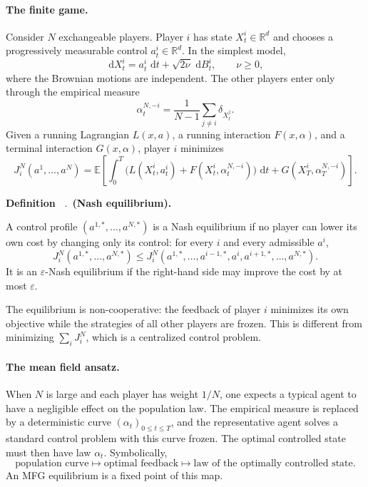\documentclass[11pt,a4paper]{article}
\theoremstyle{definition}
\newenvironment{definition}[1][]{%
  \begin{definitionbox}\refstepcounter{theorem}%
  \noindent\textbf{Definition~\thetheorem}%
  \if\relax\detokenize{#1}\relax.\else\ \textbf{(#1).}\fi\enspace
}{\end{definitionbox}}
\newcommand{\RR}{\mathbb R}
\newcommand{\dd}{\,\mathrm d}
\newcommand{\eps}{\varepsilon}
\newcommand{\al}{\alpha}
\begin{document}
\paragraph{The finite game.}
Consider $N$ exchangeable players.  Player $i$ has state
$X_t^i\in\RR^d$ and chooses a progressively measurable control
$a_t^i\in\RR^d$.  In the simplest model,
\begin{equation}\label{eq:n-player-dynamics}
  \dd X_t^i=a_t^i\,\dd t+\sqrt{2\nu}\,\dd B_t^i,
  \qquad \nu\geq0,
\end{equation}
where the Brownian motions are independent.  The other players enter only
through the empirical measure
\begin{equation}\label{eq:empirical-population}
  \al_t^{N,-i}=\frac1{N-1}\sum_{j\neq i}\delta_{X_t^j}.
\end{equation}
Given a running Lagrangian $L(x,a)$, a running interaction $F(x,\al)$, and
a terminal interaction $G(x,\al)$, player $i$ minimizes
\begin{equation}\label{eq:n-player-cost}
  J_i^N(a^1,\ldots,a^N)
  =\mathbb E\!\left[
    \int_0^T \bigl(L(X_t^i,a_t^i)+F(X_t^i,\al_t^{N,-i})\bigr)\,\dd t
    +G(X_T^i,\al_T^{N,-i})
  \right].
\end{equation}

\begin{definition}[Nash equilibrium]
A control profile $(a^{1,*},\ldots,a^{N,*})$ is a Nash equilibrium if no
player can lower its own cost by changing only its control: for every $i$
and every admissible $a^i$,
\[
  J_i^N(a^{1,*},\ldots,a^{N,*})
  \leq
  J_i^N(a^{1,*},\ldots,a^{i-1,*},a^i,a^{i+1,*},\ldots,a^{N,*}).
\]
It is an $\eps$-Nash equilibrium if the right-hand side may improve the cost
by at most $\eps$.
\end{definition}

The equilibrium is non-cooperative: the feedback of player $i$ minimizes
its own objective while the strategies of all other players are frozen.  This
is different from minimizing $\sum_iJ_i^N$, which is a centralized control
problem.

\paragraph{The mean field ansatz.}
When $N$ is large and each player has weight $1/N$, one expects a typical
agent to have a negligible effect on the population law.  The empirical
measure is replaced by a deterministic curve
$(\al_t)_{0\leq t\leq T}$, and the representative agent solves a standard
control problem with this curve frozen.  The optimal controlled state must
then have law $\al_t$.  Symbolically,
\[
  \text{population curve}
  \longmapsto
  \text{optimal feedback}
  \longmapsto
  \text{law of the optimally controlled state}.
\]
An MFG equilibrium is a fixed point of this map.
\end{document}
